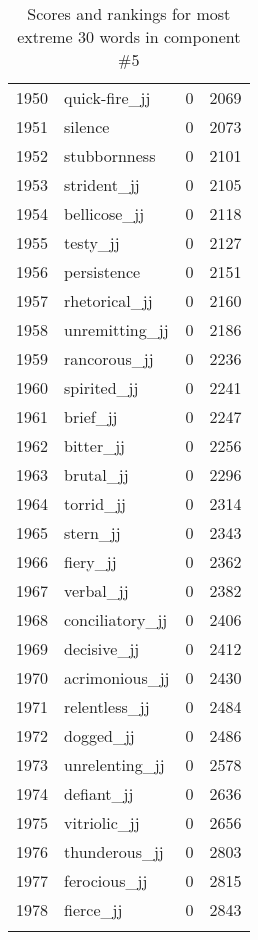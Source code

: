 \begin{longtable}[!htbp]{| rlr@{.}l |}
    1950 & quick-fire\_jj & 0 & 2069 \\
    1951 & silence & 0 & 2073 \\
    1952 & stubbornness & 0 & 2101 \\
    1953 & strident\_jj & 0 & 2105 \\
    1954 & bellicose\_jj & 0 & 2118 \\
    1955 & testy\_jj & 0 & 2127 \\
    1956 & persistence & 0 & 2151 \\
    1957 & rhetorical\_jj & 0 & 2160 \\
    1958 & unremitting\_jj & 0 & 2186 \\
    1959 & rancorous\_jj & 0 & 2236 \\
    1960 & spirited\_jj & 0 & 2241 \\
    1961 & brief\_jj & 0 & 2247 \\
    1962 & bitter\_jj & 0 & 2256 \\
    1963 & brutal\_jj & 0 & 2296 \\
    1964 & torrid\_jj & 0 & 2314 \\
    1965 & stern\_jj & 0 & 2343 \\
    1966 & fiery\_jj & 0 & 2362 \\
    1967 & verbal\_jj & 0 & 2382 \\
    1968 & conciliatory\_jj & 0 & 2406 \\
    1969 & decisive\_jj & 0 & 2412 \\
    1970 & acrimonious\_jj & 0 & 2430 \\
    1971 & relentless\_jj & 0 & 2484 \\
    1972 & dogged\_jj & 0 & 2486 \\
    1973 & unrelenting\_jj & 0 & 2578 \\
    1974 & defiant\_jj & 0 & 2636 \\
    1975 & vitriolic\_jj & 0 & 2656 \\
    1976 & thunderous\_jj & 0 & 2803 \\
    1977 & ferocious\_jj & 0 & 2815 \\
    1978 & fierce\_jj & 0 & 2843 \\
    \hline
    \caption{Scores and rankings for most extreme 30 words in component \#5} \\
\end{longtable}
